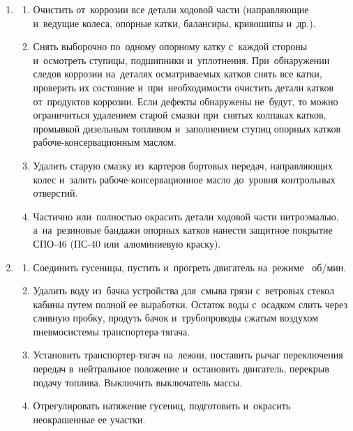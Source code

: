 \begin{enumerate}
\begin{enumerate}
    \end{enumerate}

    \item \begin{enumerate}
        \item 
        Очистить от~коррозии все детали ходовой части (направляющие и~ведущие колеса, опорные катки, балансиры, кривошипы и~др.). 
        \item 
        Снять выборочно по~одному опорному катку с~каждой стороны и~осмотреть ступицы, подшипники и~уплотнения. При~обнаружении следов коррозии на~деталях осматриваемых катков снять все катки, проверить их состояние и~при~необходимости очистить детали катков от~продуктов коррозии. Если дефекты обнаружены не~будут, то можно ограничиться удалением старой смазки при~снятых колпаках катков, промывкой дизельным топливом и~заполнением ступиц опорных катков рабоче-консервационным маслом. 
        \item 
        Удалить старую смазку из~картеров бортовых передач, направляющих колес и~залить рабоче-консервационное масло до~уровня контрольных отверстий. 
        \item 
        Частично или~полностью окрасить детали ходовой части нитроэмалью, а~на~резиновые бандажи опорных катков нанести защитное покрытие СПО-46 (ПС-40 или~алюминиевую краску). 
    \end{enumerate}

    \item \begin{enumerate}
        \item 
        Соединить гусеницы, пустить и~прогреть двигатель на~режиме ~об/мин. 
        \item 
        Удалить воду из~бачка устройства для~смыва грязи с~ветровых стекол кабины путем полной ее выработки. Остаток воды с~осадком слить через сливную пробку, продуть бачок и~трубопроводы сжатым воздухом пневмосистемы транспортера-тягача. 
        \item 
        Установить транспортер-тягач на~лежни, поставить рычаг переключения передач в~нейтральное положение и~остановить двигатель, перекрыв подачу топлива. Выключить выключатель массы. 
        \item 
        Отрегулировать натяжение гусениц, подготовить и~окрасить неокрашенные ее участки. 
    \end{enumerate}


\end{enumerate}
